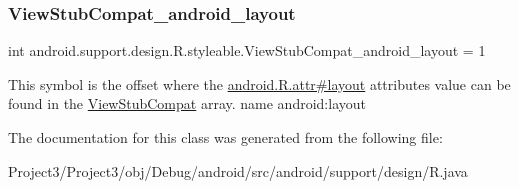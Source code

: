 \subsubsection{\texorpdfstring{View\+Stub\+Compat\+\_\+android\+\_\+layout}{ViewStubCompat\_android\_layout}}
{\footnotesize\ttfamily int android.\+support.\+design.\+R.\+styleable.\+View\+Stub\+Compat\+\_\+android\+\_\+layout = 1\hspace{0.3cm}{\ttfamily [static]}}

This symbol is the offset where the \hyperlink{}{android.\+R.\+attr\#layout} attribute\textquotesingle{}s value can be found in the \hyperlink{classandroid_1_1support_1_1design_1_1R_1_1styleable_a9d1ab53e5b97dd9ed9bd6109532344ef}{View\+Stub\+Compat} array.  name android\+:layout 

The documentation for this class was generated from the following file\+:\begin{DoxyCompactItemize}
\item 
Project3/\+Project3/obj/\+Debug/android/src/android/support/design/R.\+java\end{DoxyCompactItemize}
